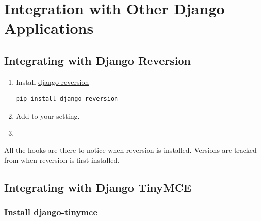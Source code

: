 \documentclass[letterpaper,10pt,english]{manual}
\begin{document}
\resetcurrentobjects
\hypertarget{--doc-integration/index}{}

\hypertarget{integration-index}{}\chapter{Integration with Other Django Applications}

\resetcurrentobjects
\hypertarget{--doc-integration/reversion_integration}{}

\hypertarget{reversion-integration}{}\section{Integrating with Django Reversion}
\begin{enumerate}
\item {} 
Install \href{http://code.google.com/p/django-reversion/}{django-reversion}

\begin{Verbatim}[commandchars=@\[\]]
pip install django-reversion
\end{Verbatim}

\item {} 
Add  to your  setting.

\item {} 

\end{enumerate}

All the hooks are there to notice when reversion is installed. Versions are tracked from when reversion is first installed.

\resetcurrentobjects
\hypertarget{--doc-integration/tinymce_integration}{}

\hypertarget{tinymce-integration}{}\section{Integrating with Django TinyMCE}


\subsection{Install django-tinymce}
\end{document}
